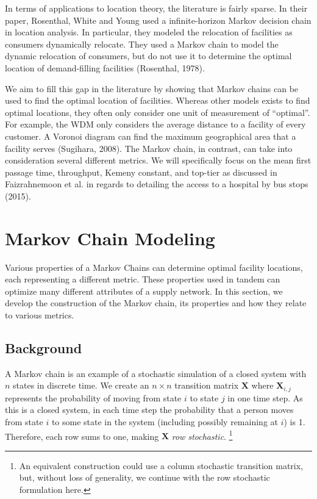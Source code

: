 \documentclass[twoside,twocolumn]{article}
\begin{document}
In terms of applications to location theory, the literature is fairly sparse.
In their paper, Rosenthal, White and Young used a infinite-horizon Markov decision chain in location analysis.
In particular, they modeled the relocation of facilities as consumers dynamically relocate.
They used a Markov chain to model the dynamic relocation of consumers, but do not use it to determine the optimal location of demand-filling facilities (Rosenthal, 1978).

We aim to fill this gap in the literature by showing that Markov chains can be used to find the optimal location of facilities.
Whereas other models exists to find optimal locations, they often only consider one unit of measurement of ``optimal''.
For example, the WDM only considers the average distance to a facility of every customer.
A Voronoi diagram can find the maximum geographical area that a facility serves (Sugihara, 2008).
The Markov chain, in contrast, can take into consideration several different metrics.
We will specifically focus on the mean first passage time, throughput, Kemeny constant, and top-tier as discussed in Faizrahnemoon et al. in regards to detailing the access to a hospital by bus stops (2015).

\section{Markov Chain Modeling}

Various properties of a Markov Chains can determine optimal facility locations, each representing a different metric.
These properties used in tandem can optimize many different attributes of a supply network.
In this section, we develop the construction of the Markov chain, its properties and how they relate to various metrics.

\subsection{Background}

A Markov chain is an example of a stochastic simulation of a closed system with $n$ states in discrete time.
We create an $n\times n$ transition matrix $\textbf{X}$ where $\textbf{X}_{i, j}$ represents the probability of moving from state $i$ to state $j$ in one time step.
As this is a closed system, in each time step the probability that a person moves from state $i$ to some state in the system (including possibly remaining at $i$) is 1. 
Therefore, each row sums to one, making $\textbf{X}$ {\em row stochastic}.
\footnote{An equivalent construction could use a column stochastic transition matrix, but, without loss of generality, we continue with the row stochastic formulation here.}
\end{document}
